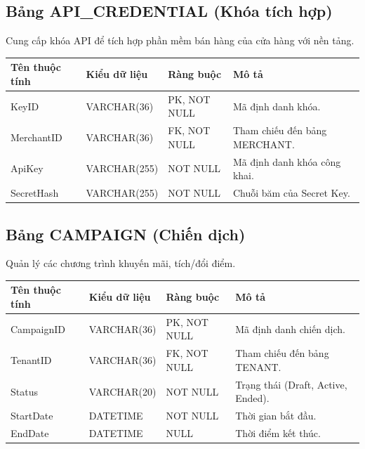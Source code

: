 \subsection{Bảng API\_CREDENTIAL (Khóa tích hợp)}
Cung cấp khóa API để tích hợp phần mềm bán hàng của cửa hàng với nền tảng.

\begin{table}[htbp]
    \centering
    \renewcommand{\arraystretch}{1.3}
    \begin{tabular}{|p{3cm}|p{3.2cm}|>{\raggedright\arraybackslash}p{3.2cm}|>{\raggedright\arraybackslash}p{4.8cm}|}
        \hline
        \textbf{Tên thuộc tính} & \textbf{Kiểu dữ liệu} & \textbf{Ràng buộc} & \textbf{Mô tả} \\ \hline
        KeyID & VARCHAR(36) & PK, NOT NULL & Mã định danh khóa. \\ \hline
        MerchantID & VARCHAR(36) & FK, NOT NULL & Tham chiếu đến bảng MERCHANT. \\ \hline
        ApiKey & VARCHAR(255) & NOT NULL & Mã định danh khóa công khai. \\ \hline
        SecretHash & VARCHAR(255) & NOT NULL & Chuỗi băm của Secret Key. \\ \hline
    \end{tabular}
\end{table}

\subsection{Bảng CAMPAIGN (Chiến dịch)}
Quản lý các chương trình khuyến mãi, tích/đổi điểm.

\begin{table}[htbp]
    \centering
    \renewcommand{\arraystretch}{1.3}
    \begin{tabular}{|p{3cm}|p{3.2cm}|>{\raggedright\arraybackslash}p{3.2cm}|>{\raggedright\arraybackslash}p{4.8cm}|}
        \hline
        \textbf{Tên thuộc tính} & \textbf{Kiểu dữ liệu} & \textbf{Ràng buộc} & \textbf{Mô tả} \\ \hline
        CampaignID & VARCHAR(36) & PK, NOT NULL & Mã định danh chiến dịch. \\ \hline
        TenantID & VARCHAR(36) & FK, NOT NULL & Tham chiếu đến bảng TENANT. \\ \hline
        Status & VARCHAR(20) & NOT NULL & Trạng thái (Draft, Active, Ended). \\ \hline
        StartDate & DATETIME & NOT NULL & Thời gian bắt đầu. \\ \hline
        EndDate & DATETIME & NULL & Thời điểm kết thúc. \\ \hline
    \end{tabular}
\end{table}

